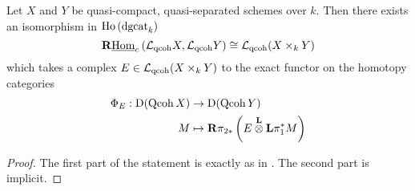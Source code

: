 \begin{theorem}
  Let \(X\) and \(Y\) be quasi-compact, quasi-separated schemes over \(k\). Then there exists an isomorphism in \(\operatorname{Ho}\left(\operatorname{dgcat}_k\right)\)
  \begin{displaymath}
    \mathbf{R}\underline{\operatorname{Hom}}_c\left(\mathcal L_{\operatorname{qcoh}} X,\mathcal L_{\operatorname{qcoh}} Y\right) \cong \mathcal L_{\operatorname{qcoh}} (X \times_k Y)
  \end{displaymath}
  which takes a complex \(E \in \mathcal L_{\operatorname{qcoh}} (X \times_k Y)\) to the exact functor on the homotopy categories
  \begin{align*}
    \Phi_E : \mathrm{D}(\operatorname{Qcoh}X) & \to \mathrm{D}(\operatorname{Qcoh}Y) \\
    M & \mapsto \mathbf{R}\pi_{2 \ast} \left( E \overset{\mathbf{L}}{\otimes} \mathbf{L}\pi_1^\ast M \right)
  \end{align*}
\end{theorem}

\begin{proof}
  The first part of the statement is exactly as in \parencite{Toen07}. The second part is implicit. 
\end{proof}
